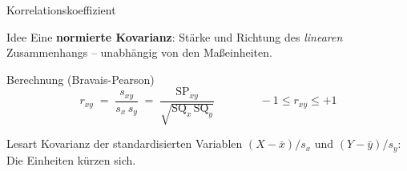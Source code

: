 \documentclass[aspectratio=169,11pt]{beamer}
\newcommand{\SQx}{\text{SQ}_x}
\newcommand{\SQy}{\text{SQ}_y}
\newcommand{\SPxy}{\text{SP}_{xy}}
\begin{document}
\begin{frame}{Korrelationskoeffizient}
  \begin{block}{Idee}
    Eine \textbf{normierte Kovarianz}: Stärke und Richtung des \emph{linearen}
    Zusammenhangs -- unabhängig von den Maßeinheiten.
  \end{block}

  \medskip

  \begin{block}{Berechnung (Bravais-Pearson)}
    \[
      r_{xy} \;=\; \frac{s_{xy}}{s_x \, s_y} \;=\; \frac{\SPxy}{\sqrt{\SQx\,\SQy}} \qquad\qquad -1 \le r_{xy} \le +1
    \]
  \end{block}

  \medskip

  \begin{exampleblock}{Lesart}
    Kovarianz der standardisierten Variablen
    $(X-\bar{x})/s_x$ und $(Y-\bar{y})/s_y$: Die Einheiten kürzen sich.
  \end{exampleblock}
\end{frame}
\end{document}
